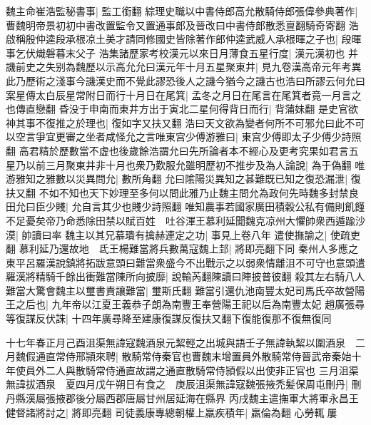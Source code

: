 魏主命崔浩監秘書事|{
	監工銜翻}
綜理史職以中書侍郎高允散騎侍郎張偉參典著作|{
	曹魏明帝景初初中書改置監令又置通事郎及晉改曰中書侍郎散悉亶翻騎奇寄翻}
浩啟稱殷仲逵段承根凉土美才請同修國史皆除著作郎仲逵武威人承根暉之子也|{
	段暉事乞伏熾磐暮末父子}
浩集諸歷家考校漢元以來日月薄食五星行度|{
	漢元漢初也}
并譏前史之失别為魏歷以示高允允曰漢元年十月五星聚東井|{
	見九卷漢高帝元年考異}
此乃歷術之淺事今譏漢史而不覺此謬恐後人之譏今猶今之譏古也浩曰所謬云何允曰案星傳太白辰星常附日而行十月日在尾箕|{
	孟冬之月日在尾言在尾箕者竟一月言之也傳直戀翻}
昏没于申南而東井方出于寅北二星何得背日而行|{
	背蒲妹翻}
是史官欲神其事不復推之於理也|{
	復如字又扶又翻}
浩曰天文欲為變者何所不可邪允曰此不可以空言爭宜更審之坐者咸怪允之言唯東宫少傅游雅曰|{
	東宫少傅即太子少傅少詩照翻}
高君精於歷數當不虚也後歲餘浩謂允曰先所論者本不經心及更考究果如君言五星乃以前三月聚東井非十月也衆乃歎服允雖明歷初不推步及為人論說|{
	為于偽翻}
唯游雅知之雅數以災異問允|{
	數所角翻}
允曰隂陽災異知之甚難既已知之復恐漏泄|{
	復扶又翻}
不如不知也天下妙理至多何以問此雅乃止魏主問允為政何先時魏多封禁良田允曰臣少賤|{
	允自言其少也賤少詩照翻}
唯知農事若國家廣田積穀公私有備則飢饉不足憂矣帝乃命悉除田禁以賦百姓　吐谷渾王慕利延聞魏克凉州大懼帥衆西遁踰沙漠|{
	帥讀曰率}
魏主以其兄慕璝有擒赫連定之功|{
	事見上卷八年}
遣使撫諭之|{
	使疏吏翻}
慕利延乃還故地　氐王楊難當將兵數萬寇魏上邽|{
	將即亮翻下同}
秦州人多應之東平呂羅漢說鎮將拓跋意頭曰難當衆盛今不出戰示之以弱衆情離沮不可守也意頭遣羅漢將精騎千餘出衝難當陳所向披靡|{
	說輸芮翻陳讀曰陣披普彼翻}
殺其左右騎八人難當大驚會魏主以璽書責讓難當|{
	璽斯氏翻}
難當引還仇池南豐太妃司馬氏卒故營陽王之后也|{
	九年帝以江夏王義恭子朗為南豐王奉營陽王祀以后為南豐太妃}
趙廣張尋等復謀反伏誅|{
	十四年廣尋降至建康復謀反復扶又翻下復能復那不復無復同}


十七年春正月己酉沮渠無諱寇魏酒泉元絜輕之出城與語壬子無諱執絜以圍酒泉　二月魏假通直常侍邢頴來聘|{
	散騎常侍秦官也曹魏末增置員外散騎常侍晉武帝秦始十年使員外二人與散騎常侍通直故謂之通直散騎常侍頴假以出使非正官也}
三月沮渠無諱拔酒泉　夏四月戊午朔日有食之　庚辰沮渠無諱寇魏張掖禿髪保周屯刪丹|{
	刪丹縣漢屬張掖郡後分屬西郡唐屬甘州居延海在縣界}
丙戌魏主遣撫軍大將軍永昌王健督諸將討之|{
	將即亮翻}
司徒義康專總朝權上羸疾積年|{
	羸倫為翻}
心勞輒屢

